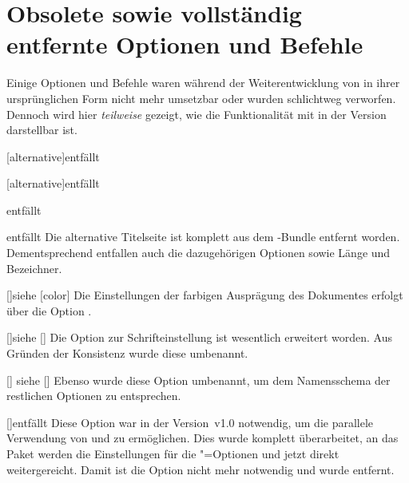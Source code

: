 \chapter{Obsolete sowie vollständig entfernte Optionen und Befehle}
\label{sec:obsolete}%
%
Einige Optionen und Befehle waren während der Weiterentwicklung von \TUDScript
in ihrer ursprünglichen Form nicht mehr umsetzbar oder wurden schlichtweg 
verworfen. Dennoch wird hier \emph{teilweise} gezeigt, wie die Funktionalität 
mit \TUDScript in der Version \vTUDScript{} darstellbar ist.

\begin{Declaration}{[alternative]}{entfällt}
\begin{Declaration}{[alternative]}{entfällt}
\begin{Declaration}{}{entfällt}
\begin{Declaration}{}{entfällt}
\printdeclarationlist*%
%
%
Die alternative Titelseite ist komplett aus dem \TUDScript-Bundle entfernt 
worden. Dementsprechend entfallen auch die dazugehörigen Optionen sowie Länge 
und Bezeichner.
\end{Declaration}
\end{Declaration}
\end{Declaration}
\end{Declaration}

\begin{Declaration}{[\PBoolean]}{siehe [color]}
\printdeclarationlist*%
%
Die Einstellungen der farbigen Ausprägung des Dokumentes erfolgt über die 
Option .
\end{Declaration}

\begin{Declaration}{[\PBoolean]}{siehe [\PSet]}
\printdeclarationlist*%
%
Die Option zur Schrifteinstellung ist wesentlich erweitert worden. Aus Gründen 
der Konsistenz wurde diese umbenannt.
\end{Declaration}

\begin{Declaration}{[\PBoolean]}{
  siehe [\PBoolean]%
}
\printdeclarationlist*%
%
Ebenso wurde diese Option umbenannt, um dem Namensschema der restlichen 
Optionen zu entsprechen.
\end{Declaration}

\begin{Declaration}{[\PSet]}{entfällt}
\printdeclarationlist*%
%
Diese Option war in der Version~v1.0 notwendig, um die parallele Verwendung von 
 und  zu ermöglichen. Dies wurde komplett 
überarbeitet, an das Paket  werden die Einstellungen für die 
\KOMAScript"=Optionen  und  jetzt 
direkt weitergereicht. Damit ist die Option  nicht mehr 
notwendig und wurde entfernt.
\end{Declaration}

